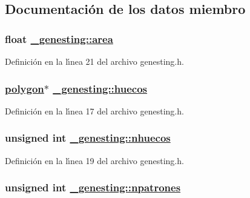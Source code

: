 \subsection{Documentaci\'{o}n de los datos miembro}
\hypertarget{struct__genesting_052920321c80561169cd61a8eb301378_052920321c80561169cd61a8eb301378}{
\subsubsection[area]{\setlength{\rightskip}{0pt plus 5cm}float \hyperlink{struct__genesting_052920321c80561169cd61a8eb301378_052920321c80561169cd61a8eb301378}{\_\-genesting::area}}}
\label{struct__genesting_052920321c80561169cd61a8eb301378_052920321c80561169cd61a8eb301378}




Definici\'{o}n en la l\'{\i}nea 21 del archivo genesting.h.\hypertarget{struct__genesting_3affb28e2ad244f35baed248e3c230f6_3affb28e2ad244f35baed248e3c230f6}{
\subsubsection[huecos]{\setlength{\rightskip}{0pt plus 5cm}\hyperlink{struct__polygon}{polygon}$\ast$ \hyperlink{struct__genesting_3affb28e2ad244f35baed248e3c230f6_3affb28e2ad244f35baed248e3c230f6}{\_\-genesting::huecos}}}
\label{struct__genesting_3affb28e2ad244f35baed248e3c230f6_3affb28e2ad244f35baed248e3c230f6}




Definici\'{o}n en la l\'{\i}nea 17 del archivo genesting.h.\hypertarget{struct__genesting_87ae802e5ffa06a1b38ce4337eadbcda_87ae802e5ffa06a1b38ce4337eadbcda}{
\subsubsection[nhuecos]{\setlength{\rightskip}{0pt plus 5cm}unsigned int \hyperlink{struct__genesting_87ae802e5ffa06a1b38ce4337eadbcda_87ae802e5ffa06a1b38ce4337eadbcda}{\_\-genesting::nhuecos}}}
\label{struct__genesting_87ae802e5ffa06a1b38ce4337eadbcda_87ae802e5ffa06a1b38ce4337eadbcda}




Definici\'{o}n en la l\'{\i}nea 19 del archivo genesting.h.\hypertarget{struct__genesting_a5ebd60476ce0253be4e5a09349433e1_a5ebd60476ce0253be4e5a09349433e1}{
\subsubsection[npatrones]{\setlength{\rightskip}{0pt plus 5cm}unsigned int \hyperlink{struct__genesting_a5ebd60476ce0253be4e5a09349433e1_a5ebd60476ce0253be4e5a09349433e1}{\_\-genesting::npatrones}}}
\label{struct__genesting_a5ebd60476ce0253be4e5a09349433e1_a5ebd60476ce0253be4e5a09349433e1}




